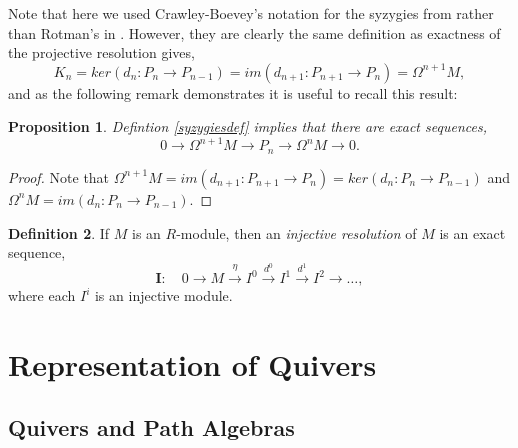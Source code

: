 \documentclass[11.5pt, twoside, a4paper, titlepage]{report}
\theoremstyle{definition}
\newtheorem{mydef}{Definition}[section]
\theoremstyle{plain}
\newtheorem{prop}[mydef]{Proposition}
\begin{document}
Note that here we used Crawley-Boevey's notation for the syzygies from \cite{CB1} rather than Rotman's in \cite{Rotman}. However, they are clearly the same definition as exactness of the projective resolution gives,
\begin{equation*}
K_n=ker(d_n:P_n \to P_{n-1}) = im(d_{n+1}:P_{n+1} \to P_n)=\Omega^{n+1}M,
\end{equation*}
and as the following remark demonstrates it is useful to recall this result:

\begin{prop}
Defintion \ref{syzygiesdef} implies that there are exact sequences,
\begin{equation*}
0 \xrightarrow{} \Omega^{n+1}M \xrightarrow{} P_n \xrightarrow{} \Omega^nM \xrightarrow{} 0.
\end{equation*}
\end{prop}
\begin{proof}
Note that $\Omega^{n+1}M=im(d_{n+1}:P_{n+1} \to P_n)=ker(d_n:P_n \to P_{n-1})$ and $\Omega^nM=im(d_n:P_n \to P_{n-1})$.
\end{proof}

\begin{mydef}
If $M$ is an $R$-module, then an \emph{injective resolution} of $M$ is an exact sequence, 
\begin{equation*}
\mathbf{I}: \quad 0 \xrightarrow{}M \xrightarrow{\eta}I^0 \xrightarrow{d^0} I^1 \xrightarrow{d^1} I^2 \xrightarrow{} \dots,
\end{equation*}
where each $I^i$ is an injective module.
\end{mydef}











\chapter{Representation of Quivers}


\section{Quivers and Path Algebras}
\end{document}
